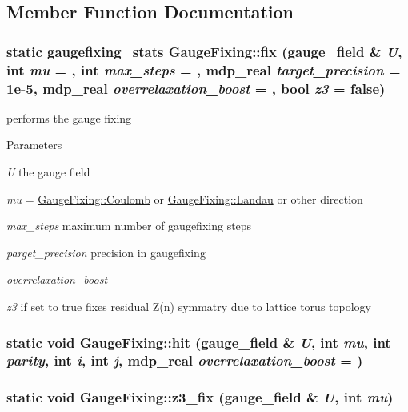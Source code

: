 \subsection{Member Function Documentation}
\hypertarget{class_gauge_fixing_a71359f7c7bd14c3c5d548cbf7e6793c5}{
\subsubsection[{fix}]{\setlength{\rightskip}{0pt plus 5cm}static {\bf gaugefixing\_\-stats} GaugeFixing::fix ({\bf gauge\_\-field} \& {\em U}, \/  int {\em mu} = {}, \/  int {\em max\_\-steps} = {}, \/  {\bf mdp\_\-real} {\em target\_\-precision} = {\ttfamily 1e-\/5}, \/  {\bf mdp\_\-real} {\em overrelaxation\_\-boost} = {}, \/  bool {\em z3} = {\ttfamily false})}}
\label{class_gauge_fixing_a71359f7c7bd14c3c5d548cbf7e6793c5}
performs the gauge fixing 
\begin{DoxyParams}{Parameters}
\item[{\em U}]the gauge field \item[{\em mu}]= \hyperlink{class_gauge_fixing_a8be5d99ab21951db104df17ffdd7362f}{GaugeFixing::Coulomb} or \hyperlink{class_gauge_fixing_a115e0b47731237fd9ff984c7f6881994}{GaugeFixing::Landau} or other direction \item[{\em max\_\-steps}]maximum number of gaugefixing steps \item[{\em parget\_\-precision}]precision in gaugefixing \item[{\em overrelaxation\_\-boost}]\item[{\em z3}]if set to true fixes residual Z(n) symmatry due to lattice torus topology \end{DoxyParams}
\hypertarget{class_gauge_fixing_a19a0c4aeaa7caa8468d702238d223e0a}{
\subsubsection[{hit}]{\setlength{\rightskip}{0pt plus 5cm}static void GaugeFixing::hit ({\bf gauge\_\-field} \& {\em U}, \/  int {\em mu}, \/  int {\em parity}, \/  int {\em i}, \/  int {\em j}, \/  {\bf mdp\_\-real} {\em overrelaxation\_\-boost} = {})}}
\label{class_gauge_fixing_a19a0c4aeaa7caa8468d702238d223e0a}
\hypertarget{class_gauge_fixing_af3a79f5db7d5c4cef7074938578eff80}{
\subsubsection[{z3\_\-fix}]{\setlength{\rightskip}{0pt plus 5cm}static void GaugeFixing::z3\_\-fix ({\bf gauge\_\-field} \& {\em U}, \/  int {\em mu})}}
\label{class_gauge_fixing_af3a79f5db7d5c4cef7074938578eff80}


